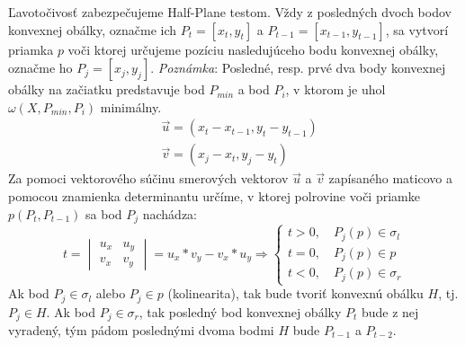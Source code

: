 \documentclass[11pt]{article}
\begin{document}
Ľavotočivosť zabezpečujeme Half-Plane testom. Vždy z posledných dvoch bodov konvexnej obálky, označme ich $P_t = [x_t, y_t]$ a $P_{t-1} = [x_{t-1}, y_{t-1}]$, sa vytvorí priamka $p$ voči ktorej určujeme pozíciu nasledujúceho bodu konvexnej obálky, označme ho $P_j = [x_j, y_j]$.\newline
\textit{Poznámka}: Posledné, resp. prvé dva body konvexnej obálky na začiatku predstavuje bod $P_{min}$ a bod $P_i$, v ktorom je uhol $\omega(X, P_{min}, P_i)$ minimálny.
\begin{align}
    \nonumber&\vec{u}=(x_t - x_{t-1}, y_t - y_{t-1})\\
    \nonumber&\vec{v}=(x_j - x_t, y_j - y_t)
\end{align}
Za pomoci vektorového súčinu smerových vektorov $\vec{u}$ a $\vec{v}$ zapísaného maticovo a pomocou znamienka determinantu určíme, v ktorej polrovine voči priamke $p(P_t, P_{t-1})$ sa bod $P_j$ nachádza:
\begin{equation*}
t=\begin{vmatrix} u_x & u_y \\ v_x & v_y  \end{vmatrix}=u_x*v_y-v_x*u_y \Rightarrow
\begin{cases}
    t>0, \quad P_j(p) \in \sigma_l \\
    t=0, \quad P_j(p) \in p\\
    t<0, \quad P_j(p)  \in \sigma_r
\end{cases}
\end{equation*}
Ak bod $P_j \in \sigma_l$ alebo $P_j \in p$ (kolinearita), tak bude tvoriť konvexnú obálku $H$, tj. $P_j \in H$. Ak bod $P_j \in \sigma_r$, tak posledný bod konvexnej obálky $P_t$ bude z nej vyradený, tým pádom poslednými dvoma bodmi $H$ bude $P_{t-1}$ a $P_{t-2}$.
\newpage
\end{document}
